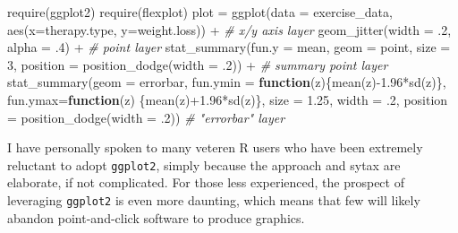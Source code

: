 \documentclass[
  english,
  man]{apa6}
\newenvironment{Shaded}{\begin{snugshade}}{\end{snugshade}}
\newcommand{\AttributeTok}[1]{\textcolor[rgb]{0.77,0.63,0.00}{#1}}
\newcommand{\CommentTok}[1]{\textcolor[rgb]{0.56,0.35,0.01}{\textit{#1}}}
\newcommand{\ControlFlowTok}[1]{\textcolor[rgb]{0.13,0.29,0.53}{\textbf{#1}}}
\newcommand{\DecValTok}[1]{\textcolor[rgb]{0.00,0.00,0.81}{#1}}
\newcommand{\FloatTok}[1]{\textcolor[rgb]{0.00,0.00,0.81}{#1}}
\newcommand{\FunctionTok}[1]{\textcolor[rgb]{0.00,0.00,0.00}{#1}}
\newcommand{\NormalTok}[1]{#1}
\newcommand{\OtherTok}[1]{\textcolor[rgb]{0.56,0.35,0.01}{#1}}
\newcommand{\SpecialCharTok}[1]{\textcolor[rgb]{0.00,0.00,0.00}{#1}}
\newcommand{\StringTok}[1]{\textcolor[rgb]{0.31,0.60,0.02}{#1}}
\begin{document}
\begin{Shaded}
\begin{Highlighting}[]
\FunctionTok{require}\NormalTok{(ggplot2)}
\FunctionTok{require}\NormalTok{(flexplot)}
\NormalTok{plot }\OtherTok{=} \FunctionTok{ggplot}\NormalTok{(}\AttributeTok{data =}\NormalTok{ exercise\_data, }\FunctionTok{aes}\NormalTok{(}\AttributeTok{x=}\NormalTok{therapy.type, }\AttributeTok{y=}\NormalTok{weight.loss)) }\SpecialCharTok{+} 
      \CommentTok{\# x/y axis layer}
  \FunctionTok{geom\_jitter}\NormalTok{(}\AttributeTok{width =}\NormalTok{ .}\DecValTok{2}\NormalTok{, }\AttributeTok{alpha =}\NormalTok{ .}\DecValTok{4}\NormalTok{) }\SpecialCharTok{+} 
      \CommentTok{\# point layer}
  \FunctionTok{stat\_summary}\NormalTok{(}\AttributeTok{fun.y =} \StringTok{\textquotesingle{}mean\textquotesingle{}}\NormalTok{, }\AttributeTok{geom =} \StringTok{\textquotesingle{}point\textquotesingle{}}\NormalTok{, }
        \AttributeTok{size =} \DecValTok{3}\NormalTok{, }\AttributeTok{position =} \FunctionTok{position\_dodge}\NormalTok{(}\AttributeTok{width =}\NormalTok{ .}\DecValTok{2}\NormalTok{)) }\SpecialCharTok{+} 
      \CommentTok{\# summary point layer}
  \FunctionTok{stat\_summary}\NormalTok{(}\AttributeTok{geom =} \StringTok{\textquotesingle{}errorbar\textquotesingle{}}\NormalTok{, }\AttributeTok{fun.ymin =} \ControlFlowTok{function}\NormalTok{(z)\{}\FunctionTok{mean}\NormalTok{(z)}\SpecialCharTok{{-}}\FloatTok{1.96}\SpecialCharTok{*}\FunctionTok{sd}\NormalTok{(z)\}, }
        \AttributeTok{fun.ymax=}\ControlFlowTok{function}\NormalTok{(z) \{}\FunctionTok{mean}\NormalTok{(z)}\SpecialCharTok{+}\FloatTok{1.96}\SpecialCharTok{*}\FunctionTok{sd}\NormalTok{(z)\}, }
        \AttributeTok{size =} \FloatTok{1.25}\NormalTok{, }\AttributeTok{width =}\NormalTok{ .}\DecValTok{2}\NormalTok{, }\AttributeTok{position =} \FunctionTok{position\_dodge}\NormalTok{(}\AttributeTok{width =}\NormalTok{ .}\DecValTok{2}\NormalTok{))  }
      \CommentTok{\# "errorbar" layer}
\end{Highlighting}
\end{Shaded}

\normalsize

I have personally spoken to many veteren R users who have been extremely reluctant to adopt \texttt{ggplot2}, simply because the approach and sytax are elaborate, if not complicated. For those less experienced, the prospect of leveraging \texttt{ggplot2} is even more daunting, which means that few will likely abandon point-and-click software to produce graphics.
\end{document}
